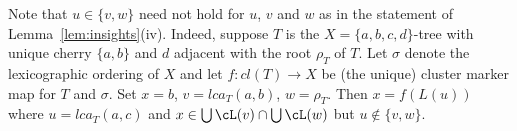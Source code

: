 Note that $u\in \{v,w\}$ need not hold for $u$, $v$ and $w$ as in the
statement of Lemma~\ref{lem:insights}(iv).  Indeed, suppose $T$ is the
$X=\{a,b,c,d\}$-tree with unique cherry $\{a,b\}$ and $d$ adjacent with the
root $\rho_T$ of $T$. Let $\sigma$ denote the lexicographic ordering of $X$
and let $f:cl(T)\to X$ be (the unique) cluster marker map for $T$ and
$\sigma$.  Set $x=b$, $v=lca_T(a,b)$, $w=\rho_T$.  Then $x=f(L(u))$ where
$u=lca_T(a,c)$ and $x\in \bigcup\cL(v)\cap \bigcup\cL(w)$ but $u\not\in
\{v,w\}$.



%

